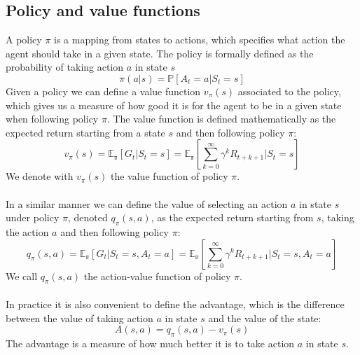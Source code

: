 \subsection{Policy and value functions}
A policy $\pi$ is a mapping from states to actions, which specifies what action the agent should take in a given state. The policy is formally defined as the probability of taking action $a$ in state $s$
\begin{equation}
    \pi(a | s) = \mathds{P}[A_t = a | S_t = s]
    \label{policy}
\end{equation}
Given a policy we can define a value function $v_{\pi}(s)$ associated to the policy, which gives us a measure of how good it is for the agent to be in a given state when following policy $\pi$. The value function is defined mathematically as the expected return starting from a state $s$ and then following policy $\pi$:
\begin{equation}
    v_{\pi}(s) = \mathds{E_{\pi}}[G_t | S_t = s] = \mathds{E_{\pi}}[\sum_{k=0}^{\infty} \gamma^k R_{t+k+1} | S_t = s]
    \label{value-function}
\end{equation}
We denote with $v_{\pi}(s)$ the value function of policy $\pi$.\\\\
In a similar manner we can define the value of selecting an action $a$ in state $s$ under policy $\pi$, denoted $q_{\pi}(s, a)$, as the expected return starting from $s$, taking the action $a$ and then following policy $\pi$:
\begin{equation}
    q_{\pi}(s, a) = \mathds{E_{\pi}}[G_t | S_t = s, A_t = a] = \mathds{E_{\pi}}[\sum_{k=0}^{\infty} \gamma^k R_{t+k+1} | S_t = s, A_t = a]
    \label{action-value-function}
\end{equation}
We call $q_{\pi}(s, a)$ the action-value function of policy $\pi$.\\\\
In practice it is also convenient to define the advantage, which is the difference between the value of taking action $a$ in state $s$ and the value of the state:
\begin{equation}
    A(s, a) = q_{\pi}(s, a) - v_{\pi}(s)
    \label{advantage}
\end{equation}
The advantage is a measure of how much better it is to take action $a$ in state $s$.\\

